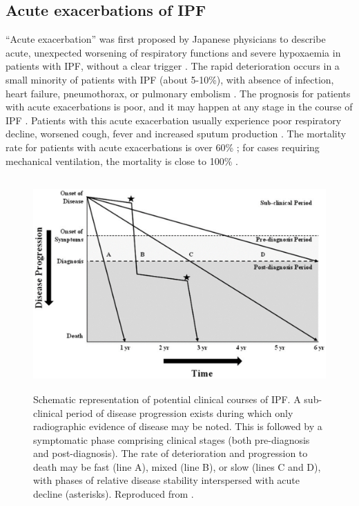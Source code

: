 \subsection{Acute exacerbations of IPF}
“Acute exacerbation” was first proposed by Japanese physicians to describe acute, unexpected worsening of respiratory functions and severe hypoxaemia in patients with IPF, without a clear trigger \citep{kondoh1993acute, gross1962concept}. The rapid deterioration occurs in a small minority of patients with IPF (about 5-10\%), with absence of infection, heart failure, pneumothorax, or pulmonary embolism \citep{azuma2005double,king2011idiopathic,raghu2011official}. The prognosis for patients with acute exacerbations is poor, and it may happen at any stage in the course of IPF \citep{kim2006acute,parambil2005histopathologic,sakamoto2009acute,kondoh2010prognostic}. Patients with this acute exacerbation usually experience poor respiratory decline, worsened cough, fever and increased sputum production \citep{ambrosini2003acute,kim2006acute}. The mortality rate for patients with acute exacerbations is over 60\% \citep{wootton2011viral, lettieri2006prevalence}; for cases requiring mechanical ventilation, the mortality is close to 100\% \citep{king2011idiopathic,xaubet2017idiopathic}.

\begin{figure}[htbp]
  \centering 
  \includegraphics[height=3.2in]{Background/Image/IPFDiseaseProgression.png}
  \caption{Schematic representation of potential clinical courses of IPF.  A sub-clinical period of disease progression exists during which only radiographic evidence of disease may be noted. This is followed by a symptomatic phase comprising clinical stages (both pre-diagnosis and post-diagnosis). The rate of deterioration and progression to death may be fast (line A), mixed (line B), or slow (lines C and D), with phases of relative disease stability interspersed with acute decline (asterisks). Reproduced from \citep{ley2011clinical}.}
  \label{fig:IPFDiseaseProgression}
\end{figure}

